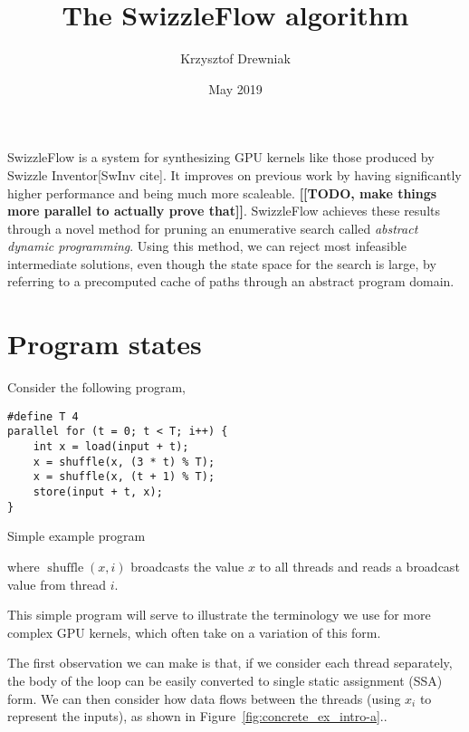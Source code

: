 \documentclass[12pt,notitlepage]{article}
\title{The SwizzleFlow algorithm}
\author{Krzysztof Drewniak}
\date{May 2019}
\begin{document}
\maketitle{}

SwizzleFlow is a system for synthesizing GPU kernels like those produced by Swizzle Inventor[SwInv cite].
It improves on previous work by having significantly higher performance and being much more scaleable. \textbf{[[TODO, make things more parallel to actually prove that]]}.
SwizzleFlow achieves these results through a novel method for pruning an enumerative search called \emph{abstract dynamic programming}.
Using this method, we can reject most infeasible intermediate solutions, even though the state space for the search is large, by referring to a precomputed cache of paths through an abstract program domain.

\section{Program states}
Consider the following program,
\begin{example}
\begin{verbatim}
#define T 4
parallel for (t = 0; t < T; i++) {
    int x = load(input + t);
    x = shuffle(x, (3 * t) % T);
    x = shuffle(x, (t + 1) % T);
    store(input + t, x);
}
\end{verbatim}
  \caption{Simple example program}
  \label{ex:intro}
\end{example}

where $\operatorname{shuffle}(x, i)$ broadcasts the value $x$ to all threads and reads a broadcast value from thread $i$.

This simple program will serve to illustrate the terminology we use for more complex GPU kernels, which often take on a variation of this form.

The first observation we can make is that, if we consider each thread separately, the body of the loop can be easily converted to single static assignment (SSA) form.
We can then consider how data flows between the threads (using $x_i$ to represent the inputs), as shown in Figure~\ref{fig:concrete_ex_intro-a}..
\end{document}

